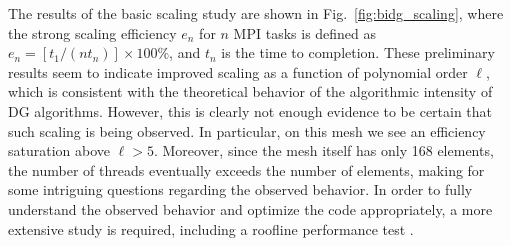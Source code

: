 The results of the basic scaling study are shown in
Fig.~\ref{fig:bidg_scaling}, where the strong scaling efficiency $e_{n}$ for
$n$ MPI tasks is defined as $e_{n}= [t_{1}/(nt_{n})]\times 100\%$, and $t_n$ is the time to
completion. These preliminary results seem to indicate improved scaling as a function of polynomial order $\ell$, which is consistent with the theoretical
behavior of the algorithmic intensity of DG algorithms.  However, this is
clearly not enough evidence to be certain that such scaling is being observed.
In particular, on this mesh we see an efficiency saturation above $\ell>5$.
Moreover, since the mesh itself has only 168 elements, the number of threads
eventually exceeds the number of elements, making for some intriguing questions
regarding the observed behavior.  In order to fully understand the observed behavior and
optimize the code appropriately, a more extensive study is required, including
%
a roofline performance test
\cite{Williams:2009:RIV:1498765.1498785}.

%
%




